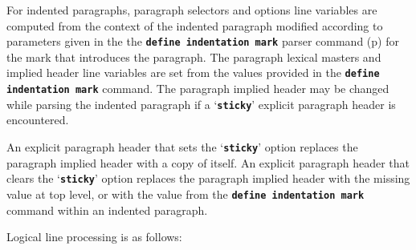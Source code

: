 \documentclass[12pt]{article}
\newcommand{\TT}[1]{{\tt \bfseries #1}}
\newcommand{\pagref}[1]{p\pageref{#1}}
\newenvironment{indpar}[1][0.3in]%
	{\begin{list}{}%
		     {\setlength{\itemsep}{0in}%
		      \setlength{\topsep}{0in}%
		      \setlength{\parsep}{1ex}%
		      \setlength{\labelwidth}{#1}%
		      \setlength{\leftmargin}{#1}%
		      \addtolength{\leftmargin}{\labelsep}}%
	 \item}%
	{\end{list}}
\begin{document}
\begin{indpar}[0.4in]
    For indented paragraphs, paragraph selectors and options line variables
    are computed from the context of the indented paragraph modified according
    to parameters given in the the \TT{define inden\-ta\-tion mark}
    parser command (\pagref{PARSER-INDENTATION-MARK-COMMAND}) for the mark
    that introduces the paragraph.  The paragraph lexical masters and
    implied header line variables are set from the values provided in the
    \TT{define inden\-ta\-tion mark} command.  The paragraph implied header
    may be changed while parsing the indented paragraph if a `\TT{sticky}'
    explicit paragraph header is encountered.

    An explicit paragraph header that sets the `\TT{sticky}' option
    replaces the paragraph implied header with a copy of itself.
    An explicit paragraph header that clears the `\TT{sticky}' option
    replaces the paragraph implied header with the missing value at
    top level, or with the value from the \TT{define indentation mark}
    command within an indented paragraph.

\end{indpar}

Logical line processing is as follows:
\end{document}
